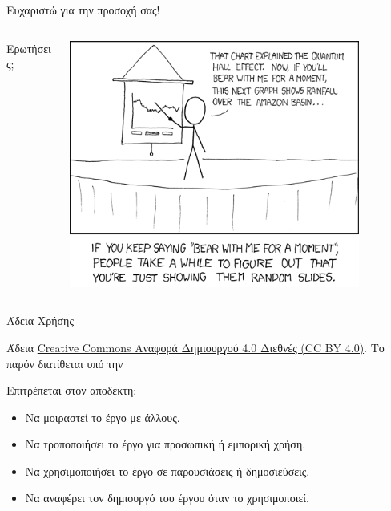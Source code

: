 \documentclass[aspectratio=169]{beamer}
\begin{document}
\begin{frame}{Ευχαριστώ για την προσοχή σας!}
  \begin{columns}
    \begin{column}{0.4\textwidth}
      \begin{center}
       \Huge{Ερωτήσεις;}
      \end{center}
    \end{column}
    \begin{column}{0.6\textwidth}
        \begin{center}
         \includegraphics[width=0.85\textwidth]{images/xkcd.png}
         \end{center}
    \end{column}
    \end{columns}
\end{frame}
\begin{frame}{Άδεια Χρήσης}
  \begin{center}
    \ccbysa
  \end{center}
  \begin{center}
    Άδεια \href{https://creativecommons.org/licenses/by/4.0/}{Creative Commons Αναφορά Δημιουργού 4.0 Διεθνές (CC BY 4.0)}.  Το παρόν διατίθεται υπό την
    \ccbysa
  \end{center}
  \begin{exampleblock}{Επιτρέπεται στον αποδέκτη:}
    \begin{itemize}
      \item Να μοιραστεί το έργο με άλλους.
      \item Να τροποποιήσει το έργο για προσωπική ή εμπορική χρήση.
      \item Να χρησιμοποιήσει το έργο σε παρουσιάσεις ή δημοσιεύσεις.
      \item Να αναφέρει τον δημιουργό του έργου όταν το χρησιμοποιεί.
    \end{itemize}
  \end{exampleblock}
\end{frame}
\end{document}
